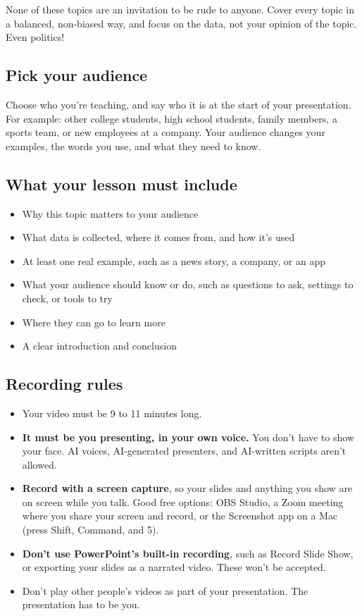 \documentclass[12pt]{article}
\begin{document}
None of these topics are an invitation to be rude to anyone. Cover every topic in a balanced, non-biased way, and focus on the data, not your opinion of the topic. Even politics!

\subsection*{Pick your audience}
Choose who you're teaching, and say who it is at the start of your presentation. For example: other college students, high school students, family members, a sports team, or new employees at a company. Your audience changes your examples, the words you use, and what they need to know.

\subsection*{What your lesson must include}
\begin{itemize}
    \item Why this topic matters to your audience
    \item What data is collected, where it comes from, and how it's used
    \item At least one real example, such as a news story, a company, or an app
    \item What your audience should know or do, such as questions to ask, settings to check, or tools to try
    \item Where they can go to learn more
    \item A clear introduction and conclusion
\end{itemize}

\subsection*{Recording rules}
\begin{itemize}
    \item Your video must be 9 to 11 minutes long.
    \item \textbf{It must be you presenting, in your own voice.} You don't have to show your face. AI voices, AI-generated presenters, and AI-written scripts aren't allowed.
    \item \textbf{Record with a screen capture}, so your slides and anything you show are on screen while you talk. Good free options: OBS Studio, a Zoom meeting where you share your screen and record, or the Screenshot app on a Mac (press Shift, Command, and 5).
    \item \textbf{Don't use PowerPoint's built-in recording}, such as Record Slide Show, or exporting your slides as a narrated video. These won't be accepted.
    \item Don't play other people's videos as part of your presentation. The presentation has to be you.
\end{itemize}
\end{document}
